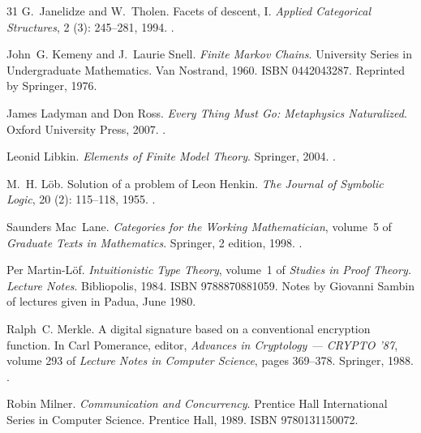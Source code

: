 \documentclass[11pt]{article}
\theoremstyle{definition}
\begin{document}
\begin{thebibliography}{31}
G.~Janelidze and W.~Tholen.
\newblock Facets of descent, {I}.
\newblock \emph{Applied Categorical Structures}, 2 (3):
  245--281, 1994.
\newblock {}.

John~G. Kemeny and J.~Laurie Snell.
\newblock \emph{Finite {M}arkov Chains}.
\newblock University Series in Undergraduate Mathematics. Van Nostrand, 1960.
\newblock ISBN 0442043287.
\newblock Reprinted by Springer, 1976.

James Ladyman and Don Ross.
\newblock \emph{Every Thing Must Go: Metaphysics Naturalized}.
\newblock Oxford University Press, 2007.
\newblock {}.

Leonid Libkin.
\newblock \emph{Elements of Finite Model Theory}.
\newblock Springer, 2004.
\newblock {}.

M.~H. L{\"o}b.
\newblock Solution of a problem of {L}eon {H}enkin.
\newblock \emph{The Journal of Symbolic Logic}, 20 (2):
  115--118, 1955.
\newblock {}.

Saunders Mac~Lane.
\newblock \emph{Categories for the Working Mathematician}, volume~5 of
  \emph{Graduate Texts in Mathematics}.
\newblock Springer, 2 edition, 1998.
\newblock {}.

Per Martin-L{\"o}f.
\newblock \emph{Intuitionistic Type Theory}, volume~1 of \emph{Studies in Proof
  Theory. Lecture Notes}.
\newblock Bibliopolis, 1984.
\newblock ISBN 9788870881059.
\newblock Notes by Giovanni Sambin of lectures given in Padua, June 1980.

Ralph~C. Merkle.
\newblock A digital signature based on a conventional encryption function.
\newblock In Carl Pomerance, editor, \emph{Advances in Cryptology --- CRYPTO
  '87}, volume 293 of \emph{Lecture Notes in Computer Science}, pages 369--378.
  Springer, 1988.
\newblock {}.

Robin Milner.
\newblock \emph{Communication and Concurrency}.
\newblock Prentice Hall International Series in Computer Science. Prentice
  Hall, 1989.
\newblock ISBN 9780131150072.


\end{thebibliography}
\end{document}
